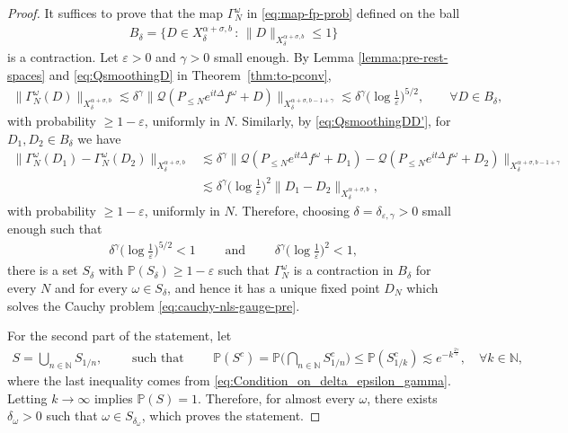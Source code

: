 \documentclass[11pt, xcolor = dvipsnames,reqno
]{amsart}
\theoremstyle{definition}
\theoremstyle{remark}
\begin{document}
\begin{proof}
It suffices to prove that the map $\Gamma_N^\omega$ in \eqref{eq:map-fp-prob} defined on the ball
\begin{align}
    B_\delta 
    = \{ D \in X^{\alpha + \sigma,b}_{\delta} \, : \, \|D\|_{X^{\alpha + \sigma, b}_\delta} \leq 1 \}
\end{align}
is a contraction. 
Let $\varepsilon > 0$ and $\gamma > 0$ small enough. By Lemma \ref{lemma:pre-rest-spaces} and \eqref{eq:QsmoothingD} in Theorem~\ref{thm:to-pconv},
\begin{align}\label{eq:Before_Contraction_Pre}
    \|\Gamma_N^\omega(D)\|_{X^{\alpha + \sigma,b}_{\delta}} \lesssim \delta^{\gamma} \| \mathcal{Q} (P_{\leq N}e^{it\Delta} f^{\omega} + D)\|_{X^{\alpha + \sigma, b - 1 + \gamma}_{\delta}} \lesssim \delta^{\gamma}\Big(  \log \frac{1}{\varepsilon} \Big)^{5/2}, 
    \qquad \forall D \in B_\delta, 
\end{align}
with probability $\geq 1 - \varepsilon$, uniformly in $N$. Similarly, by \eqref{eq:QsmoothingDD'},
for $D_1, D_2 \in B_{\delta}$ we have 
\begin{align}\label{eq:Before_Contraction}
    \|\Gamma_N^\omega(D_1) - \Gamma_N^\omega(D_2)\|_{X^{\alpha + \sigma,b}_{\delta}} &\lesssim \delta^{\gamma}  \|\mathcal{Q}(P_{\leq N}e^{it\Delta}f^{\omega} + D_1) - \mathcal{Q}(P_{\leq N}e^{it\Delta}f^{\omega} + D_2)\|_{X^{\alpha + \sigma,b - 1 + \gamma}_{\delta}} \\
    &\lesssim \delta^{\gamma} \Big(  \log \frac{1}{\varepsilon} \Big)^2\|D_1 - D_2\|_{X^{\alpha + \sigma,b}_\delta},
\end{align}
with probability $\geq 1 - \varepsilon$, uniformly in $N$. 
Therefore, 
choosing $\delta = \delta_{\varepsilon, \gamma} > 0$ small enough such that
\begin{align}\label{eq:Condition_on_delta_epsilon_gamma}
    \delta^{\gamma}\Big(  \log \frac{1}{\varepsilon} \Big)^{5/2} < 1  \qquad \text{ and } \qquad  \delta^{\gamma}\Big(  \log \frac{1}{\varepsilon} \Big)^2 < 1,
\end{align}
there is a set $S_\delta$ with 
$\mathbb P(S_\delta) \geq 1 - \varepsilon$ such that $\Gamma_N^\omega$ is a contraction in $B_\delta$ for every $N$ and for every $\omega \in S_\delta$, 
and hence it has a unique fixed point $D_N$ which solves the Cauchy problem \eqref{eq:cauchy-nls-gauge-pre}.

For the second part of the statement, let
\begin{align}
S = \bigcup_{n \in \mathbb{N}} S_{1/n},
\qquad \text{ such that } \qquad 
\mathbb{P}(S^c) 
= \mathbb{P}\Big(\bigcap_{n \in \mathbb{N}} S_{1/n}^c \Big) 
\leq \mathbb{P}(S_{1/k}^c) 
\lesssim e^{-k^{\frac{2\gamma}{5}}},
\quad \forall k \in \mathbb N, 
\end{align}
where the last inequality comes from \eqref{eq:Condition_on_delta_epsilon_gamma}.
Letting $k \to \infty$ implies $\mathbb P(S) = 1$. 
Therefore, for almost every $\omega$, there exists $\delta_\omega > 0$ such that $\omega \in S_{\delta_\omega}$, which proves the statement. 
\end{proof}
\end{document}
